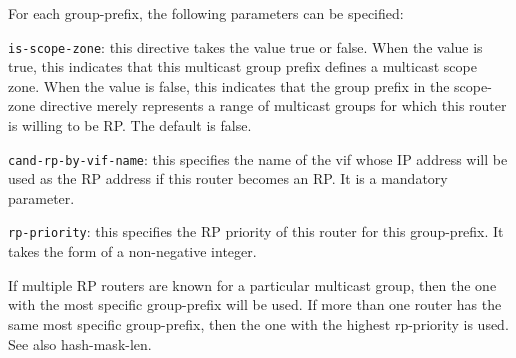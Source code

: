 \begin{description}
\begin{description}
  For each {\stt group-prefix}, the following parameters can be
  specified:
\begin{description}
\item{\tt is-scope-zone}: this directive takes the value {\stt true}
  or {\stt false}.  When the value is {\stt true}, this indicates that
  this multicast group prefix defines a multicast scope zone.  When
  the value is {\stt false}, this indicates that the group prefix in
  the {\stt scope-zone} directive merely represents a range of
  multicast groups for which this router is willing to be RP.  The
  default is {\stt false}.
\item{\tt cand-rp-by-vif-name}: this specifies the name of the {\stt
  vif} whose IP address will be used as the RP address if this router
  becomes an RP.  It is a mandatory parameter.
\item{\tt rp-priority}: this specifies the RP priority of this router
  for this {\stt group-prefix}.  It takes the form of a non-negative
  integer.

  If multiple RP routers are known for a particular multicast group,
  then the one with the most specific {\stt group-prefix} will be
  used.  If more than one router has the same most specific {\stt
  group-prefix}, then the one with the highest {\stt rp-priority} is
  used.  See also {\stt hash-mask-len}.


\end{description}
\end{description}
\end{description}
